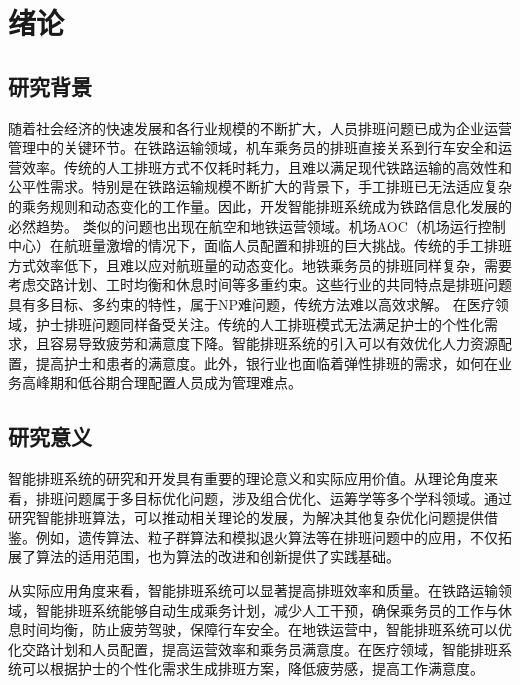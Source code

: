 \documentclass{ctexart}
\begin{document}
\tableofcontents
\clearpage

\setcounter{page}{1} %
\pagestyle{plain} %

\section{绪论}
\subsection{研究背景}
随着社会经济的快速发展和各行业规模的不断扩大，人员排班问题已成为企业运营管理中的关键环节。在铁路运输领域，机车乘务员的排班直接关系到行车安全和运营效率\cite{1016279053.nh}。传统的人工排班方式不仅耗时耗力，且难以满足现代铁路运输的高效性和公平性需求。特别是在铁路运输规模不断扩大的背景下，手工排班已无法适应复杂的乘务规则和动态变化的工作量\cite{1016279053.nh}。因此，开发智能排班系统成为铁路信息化发展的必然趋势。
类似的问题也出现在航空和地铁运营领域。机场AOC（机场运行控制中心）在航班量激增的情况下，面临人员配置和排班的巨大挑战\cite{1022506340.nh}。传统的手工排班方式效率低下，且难以应对航班量的动态变化。地铁乘务员的排班同样复杂，需要考虑交路计划、工时均衡和休息时间等多重约束\cite{1014151664.nh}。这些行业的共同特点是排班问题具有多目标、多约束的特性，属于NP难问题，传统方法难以高效求解。
在医疗领域，护士排班问题同样备受关注。传统的人工排班模式无法满足护士的个性化需求，且容易导致疲劳和满意度下降\cite{GWYG202110011}。智能排班系统的引入可以有效优化人力资源配置，提高护士和患者的满意度。此外，银行业也面临着弹性排班的需求，如何在业务高峰期和低谷期合理配置人员成为管理难点\cite{1016015859.nh}。

\subsection{研究意义}
智能排班系统的研究和开发具有重要的理论意义和实际应用价值。从理论角度来看，排班问题属于多目标优化问题，涉及组合优化、运筹学等多个学科领域\cite{DNZS202202029}。通过研究智能排班算法，可以推动相关理论的发展，为解决其他复杂优化问题提供借鉴。例如，遗传算法、粒子群算法和模拟退火算法等在排班问题中的应用，不仅拓展了算法的适用范围，也为算法的改进和创新提供了实践基础\cite{RJDK202301028}。

从实际应用角度来看，智能排班系统可以显著提高排班效率和质量。在铁路运输领域，智能排班系统能够自动生成乘务计划，减少人工干预，确保乘务员的工作与休息时间均衡，防止疲劳驾驶，保障行车安全\cite{1016279053.nh}。在地铁运营中，智能排班系统可以优化交路计划和人员配置，提高运营效率和乘务员满意度\cite{1014151664.nh}。在医疗领域，智能排班系统可以根据护士的个性化需求生成排班方案，降低疲劳感，提高工作满意度\cite{GWYG202110011}。
\end{document}
